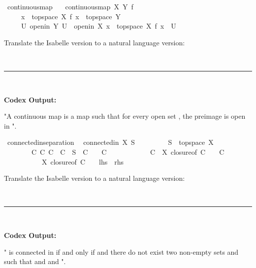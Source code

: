 \documentclass{article}
\begin{document}
\begin{boxB}
\begin{isabelle}
\isamarkupfalse \ continuous{\isacharunderscore}{\kern0pt}map\ \isanewline
\ \ {\isachardoublequoteopen}continuous{\isacharunderscore}{\kern0pt}map\ X\ Y\ f\ {\isasymequiv}\isanewline
\ \ \ \ \ {\isacharparenleft}{\kern0pt}{\isasymforall}x\ {\isasymin}\ topspace\ X{\isachardot}{\kern0pt}\ f\ x\ {\isasymin}\ topspace\ Y{\isacharparenright}{\kern0pt}\ {\isasymand}\isanewline
\ \ \ \ \ {\isacharparenleft}{\kern0pt}{\isasymforall}U{\isachardot}{\kern0pt}\ openin\ Y\ U\ {\isasymlongrightarrow}\ openin\ X\ {\isacharbraceleft}{\kern0pt}x\ {\isasymin}\ topspace\ X{\isachardot}{\kern0pt}\ f\ x\ {\isasymin}\ U{\isacharbraceright}{\kern0pt}{\isacharparenright}{\kern0pt}{\isachardoublequoteclose}
\end{isabelle}
Translate the Isabelle version to a natural language version:

\
\hrule
\

\textbf{Codex Output:}

"A continuous map  is a map such that for every open set , the preimage  is open in ". 
\end{boxB}

\begin{boxB}
\begin{isabelle}
\isamarkupfalse \ connectedin{\isacharunderscore}{\kern0pt}separation{\isacharcolon}{\kern0pt}\isanewline
\ \ {\isachardoublequoteopen}connectedin\ X\ S\ {\isasymlongleftrightarrow}\isanewline
\ \ \ \ \ \ \ \ S\ {\isasymsubseteq}\ topspace\ X\ {\isasymand}\isanewline
\ \ \ \ \ \ \ \ {\isacharparenleft}{\kern0pt}{\isasymnexists}C{}\ C{}{\isachardot}{\kern0pt}\ C{}\ {\isasymunion}\ C{}\ {\isacharequal}{\kern0pt}\ S\ {\isasymand}\ C{}\ {\isasymnoteq}\ {\isacharbraceleft}{\kern0pt}{\isacharbraceright}{\kern0pt}\ {\isasymand}\ C{}\ {\isasymnoteq}\ {\isacharbraceleft}{\kern0pt}{\isacharbraceright}{\kern0pt}\ \isanewline
\ \ \ \ \ \ \ \ {\isasymand}\ C{}\ {\isasyminter}\ X\ closure{\isacharunderscore}{\kern0pt}of\ C{\isadigit{2}}\ {\isacharequal}{\kern0pt}\ {\isacharbraceleft}{\kern0pt}{\isacharbraceright}{\kern0pt}\ {\isasymand}\ C{\isadigit{2}}\ \isanewline
\ \ \ \ \ \ \ \ \ \ {\isasyminter}\ X\ closure{\isacharunderscore}{\kern0pt}of\ C{\isadigit{1}}\ {\isacharequal}{\kern0pt}\ {\isacharbraceleft}{\kern0pt}{\isacharbraceright}{\kern0pt}{\isacharparenright}{\kern0pt}{\isachardoublequoteclose}\ {\isacharparenleft}{\kern0pt}\ {\isachardoublequoteopen}{\isacharquery}{\kern0pt}lhs\ {\isacharequal}{\kern0pt}\ {\isacharquery}{\kern0pt}rhs{\isachardoublequoteclose}{\isacharparenright}{\kern0pt}
\end{isabelle}
Translate the Isabelle version to a natural language version:

\
\hrule
\

\textbf{Codex Output:}

" is connected in  if and only if  and there do not exist two non-empty sets  and  such that  and  and ".
\end{boxB}
\end{document}

